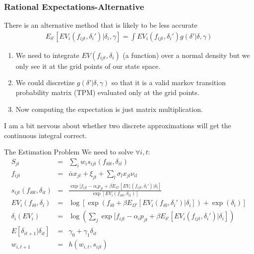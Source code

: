 \begin{frame}
\frametitle{Rational Expectations-Alternative}
There is an alternative method that is likely to be less accurate
\begin{eqnarray*}
E_{\delta'}[ E V_i (f_{ijt}, \delta_i') |\delta_i, \gamma ]= \int EV_i(f_{ijt},\delta_{i}') g(\delta' | \delta, \gamma)
\end{eqnarray*}
\begin{enumerate}
\item We need to integrate $EV(f_{ijt},\delta_i)$ (a function) over a normal density but we only see it at the grid points of our state space.
\item We could \alert{discretize $g(\delta' | \delta,\gamma)$} so that it is a valid markov transition probability matrix (TPM) evaluated only at the grid points.
\item Now computing the expectation is just matrix multiplication.
\end{enumerate}
I am a bit nervous about whether two discrete approximations will get the continuous integral correct.
\end{frame}

\begin{frame}{The Estimation Problem}
We need to solve $\forall i, t $:
\begin{eqnarray*}
S_{jt} &=& \sum_i w_i s_{ijt}(f_{i0t},\delta_{it})\\
f_{ijt} &=& \overline{\alpha} x_{jt} + \xi_{jt} + \sum_l \sigma_l x_{jl} \nu_{il} \\
s_{ijt}(f_{i0t},\delta_{it}) &=& \frac{\exp[f_{ijt} - \alpha_i p_{jt} + \beta E_{\Omega'}[ EV_i (f_{ijt}, \delta_i') |\delta_i] }{\exp [EV_i(f_{i0t},\delta_{it}) ]}\\
EV_i(f_{i0}, \delta_i) &=& \log\left[ \exp( f_{i0} + \beta E_{\Omega'}[ EV_i (f_{i0}, \delta_i') |\delta_i] )+ \exp(\delta_i)  \right]\\
\delta_{i}(EV_i) &=& \log \left( \sum_j \exp[ f_{ijt}  -\alpha_i p_{jt} + \beta E_{\delta'}[ E V_i (f_{ijt}, \delta_i') |\delta_i ]  \right)\\
E[\delta_{it+1} | \delta_{it}] &=& \gamma_0 + \gamma_1 \delta_{it}\\
w_{i,t+1} &=&h(w_{i,t},s_{ijt})\\
\end{eqnarray*}
\end{frame}

